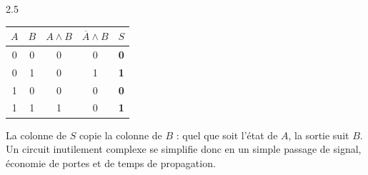\begin{corrige}{2.5}
\begin{center}
\begin{tabular}{cc|cc|c}
\toprule
\rowcolor{robleuf}$A$ & $B$ & $A \land B$ & $\overline{A} \land B$ & $S$ \\
\midrule
0 & 0 & 0 & 0 & \textbf{0} \\
\rowcolor{rogrisf!50}0 & 1 & 0 & 1 & \textbf{1} \\
1 & 0 & 0 & 0 & \textbf{0} \\
\rowcolor{rogrisf!50}1 & 1 & 1 & 0 & \textbf{1} \\
\bottomrule
\end{tabular}
\end{center}
La colonne de $S$ copie la colonne de $B$ : quel que soit l'état de $A$, la sortie suit $B$. Un circuit inutilement complexe se simplifie donc en un simple passage de signal, économie de portes et de temps de propagation.
\end{corrige}
